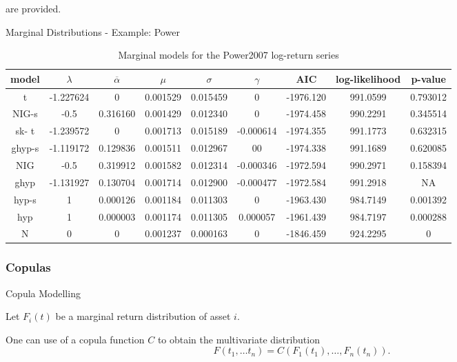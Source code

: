 

are provided.

{Marginal Distributions - Example: Power}

{\tiny

\begin{table}[ht]
            \vspace{0.5cm}
                \begin{tabular}{c|c|c|c|c|c|c|c|c}
                    model&$\lambda$&$\overline{\alpha}$&$\mu$&$\sigma$&$\gamma$&AIC&log-likelihood&p-value\\\hline
                    t&-1.227624&0&0.001529&0.015459&0&-1976.120&991.0599&0.793012\\
                    NIG-s&-0.5&0.316160&0.001429&0.012340&0&-1974.458&990.2291&0.345514\\
                    sk- t&-1.239572&0&0.001713&0.015189&-0.000614&-1974.355&991.1773&0.632315\\
                    ghyp-s&-1.119172&0.129836&0.001511&0.012967&00&-1974.338&991.1689&0.620085\\
                    NIG&-0.5&0.319912&0.001582&0.012314&-0.000346&-1972.594&990.2971&0.158394\\
                    ghyp&-1.131927&0.130704&0.001714&0.012900&-0.000477&-1972.584&991.2918&NA\\
                    hyp-s&1&0.000126&0.001184&0.011303&0&-1963.430&984.7149&0.001392\\
                    hyp&1&0.000003&0.001174&0.011305&0.000057&-1961.439&984.7197&0.000288\\
                    N &0&0&0.001237&0.000163&0&-1846.459&924.2295&0
                \end{tabular}
                \caption{Marginal models for the Power2007 log-return series}
        \end{table}
}

\subsubsection{Copulas}

{Copula Modelling}

Let $F_i(t)$ be a marginal return distribution
of asset $i$.

One can use of a copula function $C$ to obtain the multivariate
 distribution
$$
F(t_1, \ldots t_n)=C(F_1(t_1),\ldots,F_n(t_n)).
$$

